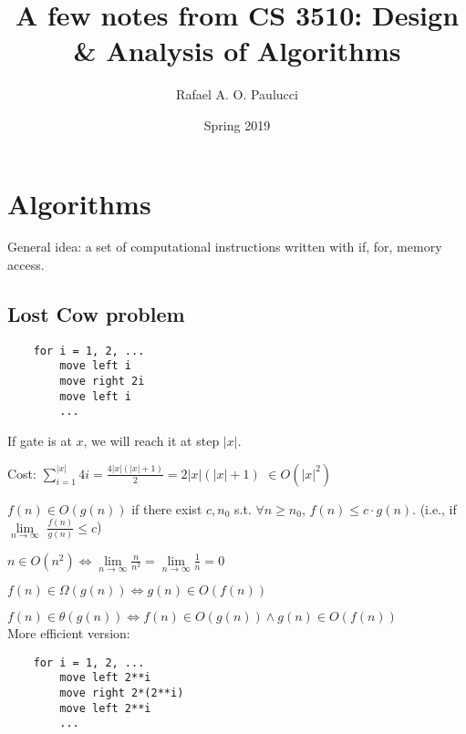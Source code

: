 \documentclass[english,openany]{book}
\begin{document}
    \title{A few notes from CS 3510: Design \& Analysis of Algorithms}
    \author{Rafael A. O. Paulucci}
    \date{Spring 2019}

    \maketitle

    \tableofcontents


    \chapter{Algorithms}

    General idea: a set of computational instructions written with if, for, memory access.

    \section{Lost Cow problem}

    \begin{lstlisting}
    for i = 1, 2, ...
        move left i
        move right 2i
        move left i
        ...
    \end{lstlisting}

    If gate is at $x$, we will reach it at step $|x|$.

    Cost: $\sum_{i=1}^{|x|} 4i = \frac{4|x|(|x|+1)}{2} = 2|x|(|x|+1)$ $\in O(|x|^2)$

    $f(n) \in O(g(n))$ if there exist $c, n_0$ s.t. $\forall n \geq n_0$, $f(n) \leq c \cdot g(n)$. (i.e., if $\lim\limits_{n \rightarrow \infty}$ $\frac{f(n)}{g(n)} \leq c$)

    $n \in O(n^2) \iff \lim\limits_{n \rightarrow \infty} \frac{n}{n^2} = \lim\limits_{n \rightarrow \infty} \frac{1}{n} = 0$

    $f(n) \in \Omega(g(n)) \iff g(n) \in O(f(n))$

    $f(n) \in \theta(g(n)) \iff  f(n) \in O(g(n)) \wedge g(n) \in O(f(n))$\\

    \newpage
    More efficient version:

    \begin{lstlisting}
    for i = 1, 2, ...
        move left 2**i
        move right 2*(2**i)
        move left 2**i
        ...
    \end{lstlisting}
\end{document}
